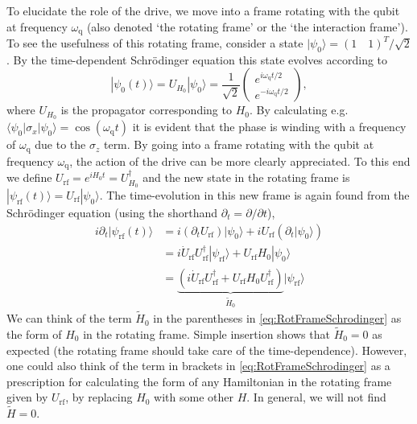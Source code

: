 \documentclass[aip,apr,twocolumn,showpacs,superscriptaddress,groupedaddress,nofootinbib,reprint]{revtex4-1}  %
\newcommand{\freq}{\omega_\text{q}}
\newcommand{\rf}{\text{rf}}
\begin{document}
To elucidate the role of the drive, we move into a frame rotating with the qubit at frequency $\freq$ (also denoted `the rotating frame' or the `the interaction frame'). To see the usefulness of this rotating frame, consider a state $|\psi_0\rangle = ( 1 \quad 1)^T/\sqrt{2}$. By the time-dependent Schr\"odinger equation this state evolves according to
\begin{equation}
|\psi_0(t)\rangle = U_{H_0}|\psi_0\rangle = \frac{1}{\sqrt{2}}\begin{pmatrix} e^{i\freq t/2} \\ e^{-i\freq t/2} \end{pmatrix},
\end{equation}
where $U_{H_0}$ is the propagator corresponding to $H_0$. By calculating e.g. $\langle \psi_0| \sigma_x|\psi_0\rangle = \cos(\freq t)$ it is evident that the phase is winding with a frequency of $\freq$ due to the $\sigma_z$ term. By going into a frame rotating with the qubit at frequency $\freq$, the action of the drive can be more clearly appreciated. To this end we define $U_\rf = e^{iH_0 t} = U_{H_0}^\dagger$ and the new state in the rotating frame is $|\psi_\rf(t)\rangle = U_\rf|\psi_0\rangle$. The time-evolution in this new frame is again found from the Schr\"odinger equation (using the shorthand $\partial_t = \partial / \partial t$),
\begin{align}
i \partial_t |\psi_\rf(t)\rangle &= i(\partial_tU_\rf)|\psi_0\rangle + i U_\rf\left(\partial_t|\psi_0\rangle\right)\\
 &= i\dot U_\rf U_\rf^\dagger|\psi_\rf\rangle + U_\rf H_0 |\psi_0\rangle \\
 &= \underbrace{\left(i\dot U_\rf U_\rf^\dagger  + U_\rf H_0 U^\dagger_\rf\right)}_{\widetilde H_0}|\psi_\rf\rangle \label{eq:RotFrameSchrodinger}
\end{align}
We can think of the term $\widetilde H_0$ in the parentheses in \cref{eq:RotFrameSchrodinger} as the form of $H_0$ in the rotating frame. Simple insertion shows that $\widetilde H_0 = 0$ as expected (the rotating frame should take care of the time-dependence). However, one could also think of the term in brackets in \cref{eq:RotFrameSchrodinger} as a prescription for calculating the form of any Hamiltonian in the rotating frame given by $U_\rf$, by replacing $H_0$ with some other $H$. In general, we will not find $\widetilde H = 0$.
\end{document}
